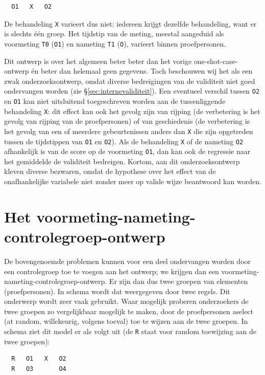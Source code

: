 \documentclass[
]{book}
\begin{document}
\begin{verbatim}
  O1   X   O2
\end{verbatim}

De behandeling \texttt{X} varieert dus niet: iedereen krijgt dezelfde
behandeling, want er is slechts één groep. Het tijdstip van de meting,
meestal aangeduid als voormeting \texttt{T0} (\texttt{O1}) en nameting \texttt{T1} (\texttt{O}),
varieert binnen proefpersonen.

Dit ontwerp is over het algemeen beter beter dan het vorige
one-shot-case-ontwerp én beter dan helemaal geen gegevens. Toch
beschouwen wij het als een zwak onderzoeksontwerp, omdat diverse
bedreigingen van de validiteit niet goed ondervangen worden (zie
§\ref{sec:internevaliditeit}). Een eventueel verschil tussen \texttt{O2}
en \texttt{O1} kan niet uitsluitend toegeschreven worden aan de tussenliggende
behandeling \texttt{X}: dit effect kan ook het gevolg zijn van rijping (de
verbetering is het gevolg van rijping van de proefpersonen) of van
geschiedenis (de verbetering is het gevolg van een of meerdere
gebeurtenissen anders dan \texttt{X} die zijn opgetreden tussen de tijdstippen
van \texttt{O1} en \texttt{O2}). Als de behandeling \texttt{X} of de nameting \texttt{O2}
afhankelijk is van de score op de voormeting \texttt{O1}, dan kan ook de
regressie naar het gemiddelde de validiteit bedreigen. Kortom, aan dit
onderzoeksontwerp kleven diverse bezwaren, omdat de hypothese over het
effect van de onafhankelijke variabele niet zonder meer op valide wijze
beantwoord kan worden.

\section{Het voormeting-nameting-controlegroep-ontwerp}\label{sec:voormeting-nameting-controlegroep-ontwerp}

De bovengenoemde problemen kunnen voor een deel ondervangen worden door
een controlegroep toe te voegen aan het ontwerp; we krijgen dan een
voormeting-nameting-controlegroep-ontwerp. Er zijn dan dus twee groepen
van elementen (proefpersonen). In schema wordt dat weergegeven door twee
regels. Dit onderwerp wordt zeer vaak gebruikt. Waar mogelijk proberen
onderzoekers de twee groepen zo vergelijkbaar mogelijk te maken, door de
proefpersonen aselect (at random, willekeurig, volgens toeval) toe te
wijzen aan de twee groepen. In schema ziet dit model er als volgt uit
(de \texttt{R} staat voor random toewijzing aan de twee groepen):

\begin{verbatim}
  R   O1   X   O2
  R   O3       O4
\end{verbatim}
\end{document}
